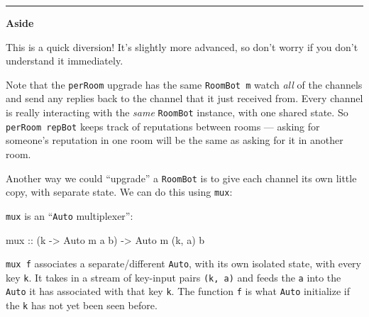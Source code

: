 \documentclass[]{article}
\newenvironment{Shaded}{}{}
\newcommand{\KeywordTok}[1]{\textcolor[rgb]{0.00,0.44,0.13}{\textbf{#1}}}
\newcommand{\DataTypeTok}[1]{\textcolor[rgb]{0.56,0.13,0.00}{#1}}
\newcommand{\CommentTok}[1]{\textcolor[rgb]{0.38,0.63,0.69}{\textit{#1}}}
\newcommand{\OtherTok}[1]{\textcolor[rgb]{0.00,0.44,0.13}{#1}}
\newcommand{\FunctionTok}[1]{\textcolor[rgb]{0.02,0.16,0.49}{#1}}
\newcommand{\NormalTok}[1]{#1}
\begin{document}
\begin{center}\rule{0.5\linewidth}{\linethickness}\end{center}

\textbf{Aside}

This is a quick diversion! It's slightly more advanced, so don't worry if you
don't understand it immediately.

Note that the \texttt{perRoom} upgrade has the same \texttt{RoomBot\ m} watch
\emph{all} of the channels and send any replies back to the channel that it just
received from. Every channel is really interacting with the \emph{same}
\texttt{RoomBot} instance, with one shared state. So \texttt{perRoom\ repBot}
keeps track of reputations between rooms --- asking for someone's reputation in
one room will be the same as asking for it in another room.

Another way we could ``upgrade'' a \texttt{RoomBot} is to give each channel its
own little copy, with separate state. We can do this using \texttt{mux}:

\begin{Shaded}
\end{Shaded}

\texttt{mux} is an ``\texttt{Auto} multiplexer'':

\begin{Shaded}
\begin{Highlighting}[]
\OtherTok{mux ::}\NormalTok{ (k }\OtherTok{->} \DataTypeTok{Auto}\NormalTok{ m a b) }\OtherTok{->} \DataTypeTok{Auto}\NormalTok{ m (k, a) b}
\end{Highlighting}
\end{Shaded}

\texttt{mux\ f} associates a separate/different \texttt{Auto}, with its own
isolated state, with every key \texttt{k}. It takes in a stream of key-input
pairs \texttt{(k,\ a)} and feeds the \texttt{a} into the \texttt{Auto} it has
associated with that key \texttt{k}. The function \texttt{f} is what
\texttt{Auto} initialize if the \texttt{k} has not yet been seen before.
\end{document}
